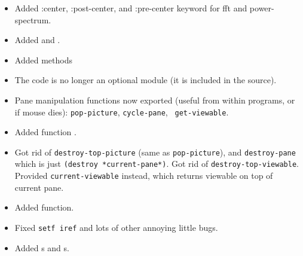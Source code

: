 \begin{itemize}
\item Added :center, :post-center, and :pre-center keyword for fft
and power-spectrum. 

\item Added  and .

\item Added    methods

\item The  code is no longer an optional module
(it is included in the source).

\item Pane manipulation functions now exported (useful from within
programs, or if mouse dies): {\tt pop-picture}, {\tt cycle-pane}, {\tt
get-viewable}.

\item Added function . 

\item Got rid of {\tt destroy-top-picture} (same as {\tt pop-picture}), and
{\tt destroy-pane} which is just {\tt (destroy *current-pane*)}.  Got
rid of {\tt destroy-top-viewable}.  Provided {\tt current-viewable}
instead, which returns viewable on top of current pane.

\item Added  function.

\item Fixed {\tt setf iref} and lots of other annoying little bugs.

\item Added s and s.

\end{itemize}
